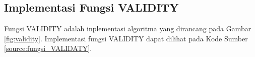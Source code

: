 \begin{minipage}{\linewidth}

\end{minipage} 

\subsection{Implementasi Fungsi VALIDITY}
Fungsi VALIDITY adalah inplementasi algoritma yang dirancang pada Gambar \ref{fig:validity}. Implementasi fungsi VALIDITY dapat dilihat pada Kode Sumber \ref{source:fungsi_VALIDATY}.


